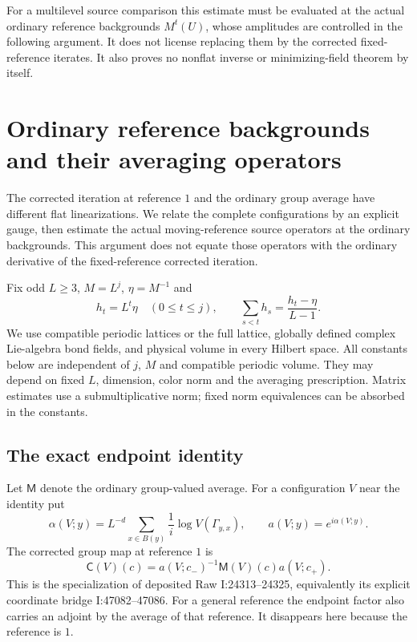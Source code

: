 \documentclass[11pt]{article}
\theoremstyle{remark}
\newcommand{\norm}[1]{\left\|#1\right\|}
\begin{document}
For a multilevel source comparison this estimate must be evaluated
at the actual ordinary reference backgrounds $M^t(U)$, whose
amplitudes are controlled in the following argument. It does not
license replacing them by the corrected fixed-reference iterates.
It also proves no nonflat inverse or minimizing-field theorem by
itself.


\section{Ordinary reference backgrounds and their averaging operators}
\label{nb-section}

The corrected iteration at reference $1$ and the ordinary group
average have different flat linearizations. We relate the complete
configurations by an explicit gauge, then estimate the actual
moving-reference source operators at the ordinary backgrounds.
This argument does not equate those operators with the ordinary
derivative of the fixed-reference corrected iteration.

Fix odd $L\ge3$, $M=L^j$, $\eta=M^{-1}$ and
\begin{equation}\label{nb-scales}
 h_t=L^t\eta\quad(0\le t\le j),\qquad
 \sum_{s<t}h_s=\frac{h_t-\eta}{L-1}.
\end{equation}
We use compatible periodic lattices or the full lattice, globally
defined complex Lie-algebra bond fields, and physical volume in
every Hilbert space. All constants below are independent of $j$,
$M$ and compatible periodic volume. They may depend on fixed
$L$, dimension, color norm and the averaging prescription.
Matrix estimates use a submultiplicative norm; fixed norm
equivalences can be absorbed in the constants.

\subsection{The exact endpoint identity}
\label{nb-source}

Let $\mathsf M$ denote the ordinary group-valued average. For a
configuration $V$ near the identity put
\begin{equation}\label{nb-endpoint-map}
 \alpha(V;y)=L^{-d}\sum_{x\in B(y)}\frac1i
                      \log V(\Gamma_{y,x}),\qquad
 a(V;y)=e^{i\alpha(V;y)}.
\end{equation}
The corrected group map at reference $1$ is
\begin{equation}\label{nb-corrected-map}
 \mathsf C(V)(c)
   =a(V;c_-)^{-1}\mathsf M(V)(c)a(V;c_+).
\end{equation}
This is the specialization of deposited Raw I:24313--24325,
equivalently its explicit coordinate bridge I:47082--47086.
For a general reference the endpoint factor also carries an
adjoint by the average of that reference. It disappears here
because the reference is $1$.
\end{document}

